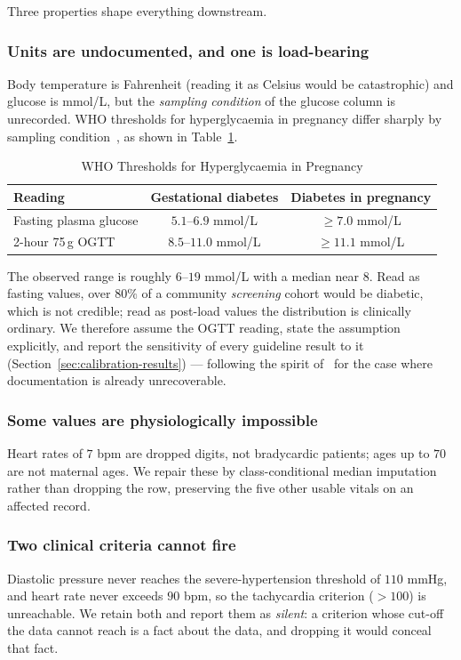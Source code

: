 \documentclass[journal]{IEEEtran}
\newcommand{\hdr}[1]{\textbf{#1}}
\begin{document}
Three properties shape everything downstream.

\subsubsection{Units are undocumented, and one is load-bearing}
Body temperature is Fahrenheit (reading it as Celsius would be catastrophic) and
glucose is mmol/L, but the \emph{sampling condition} of the glucose column is
unrecorded. WHO thresholds for hyperglycaemia in pregnancy differ sharply by
sampling condition~\cite{who-hip-2013}, as shown in Table~\ref{tab:who}.

\begin{table}[!t]
\renewcommand{\arraystretch}{1.25}
\caption{WHO Thresholds for Hyperglycaemia in Pregnancy}
\label{tab:who}
\centering
\footnotesize
\begin{tabular}{@{}lcc@{}}
\toprule
\hdr{Reading} & \hdr{Gestational diabetes} & \hdr{Diabetes in pregnancy} \\
\midrule
Fasting plasma glucose & $5.1$--$6.9$ mmol/L & $\geq 7.0$ mmol/L \\
2-hour 75\,g OGTT      & $8.5$--$11.0$ mmol/L & $\geq 11.1$ mmol/L \\
\bottomrule
\end{tabular}
\end{table}

The observed range is roughly $6$--$19$ mmol/L with a median near $8$. Read as
fasting values, over $80\%$ of a community \emph{screening} cohort would be
diabetic, which is not credible; read as post-load values the distribution is
clinically ordinary. We therefore assume the OGTT reading, state the assumption
explicitly, and report the sensitivity of every guideline result to it
(Section~\ref{sec:calibration-results}) --- following the spirit
of~\cite{gebru2021datasheets} for the case where documentation is already
unrecoverable.

\subsubsection{Some values are physiologically impossible}
Heart rates of $7$ bpm are dropped digits, not bradycardic patients; ages up to
$70$ are not maternal ages. We repair these by class-conditional median
imputation rather than dropping the row, preserving the five other usable vitals
on an affected record.

\subsubsection{Two clinical criteria cannot fire}
Diastolic pressure never reaches the severe-hypertension threshold of $110$
mmHg, and heart rate never exceeds $90$ bpm, so the tachycardia criterion
($>100$) is unreachable. We retain both and report them as \emph{silent}: a
criterion whose cut-off the data cannot reach is a fact about the data, and
dropping it would conceal that fact.
\end{document}
